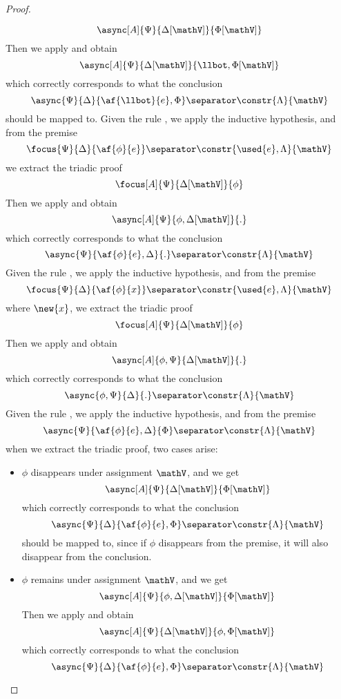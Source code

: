 \begin{proof}
\begin{itemize}
			$$ \async[A]{\Psi}{\Delta[\mathV]}{\Phi[\mathV]} $$
			Then we apply \derRule[A]{\displaybot} and obtain
			$$ \async[A]{\Psi}{\Delta[\mathV]}{\llbot, \Phi[\mathV]} $$
			which correctly corresponds to what the conclusion
			$$ \async{\Psi}{\Delta}{\af{\llbot}{e}, \Phi} \separator \constr{\Lambda}{\mathV} $$
			should be mapped to.
		\indCase{\displaydecide[1]} Given the rule \derRule{\displaydecide[1]}, we apply the inductive hypothesis, and from the premise
			$$ \focus{\Psi}{\Delta}{\af{\phi}{e}} \separator \constr{\used{e}, \Lambda}{\mathV} $$
			we extract the triadic proof
			$$ \focus[A]{\Psi}{\Delta[\mathV]}{\phi} $$
			Then we apply \derRule[A]{\displaydecide[1]} and obtain
			$$ \async[A]{\Psi}{\phi, \Delta[\mathV]}{.} $$
			which correctly corresponds to what the conclusion
			$$ \async{\Psi}{\af{\phi}{e}, \Delta}{.} \separator \constr{\Lambda}{\mathV} $$
		\indCase{\displaydecide[2]} Given the rule \derRule{\displaydecide[2]}, we apply the inductive hypothesis, and from the premise
			$$ \focus{\Psi}{\Delta}{\af{\phi}{x}} \separator \constr{\used{e}, \Lambda}{\mathV} $$
			where $\new{x}$, we extract the triadic proof
			$$ \focus[A]{\Psi}{\Delta[\mathV]}{\phi} $$
			Then we apply \derRule[A]{\displaydecide[2]} and obtain
			$$ \async[A]{\phi, \Psi}{ \Delta[\mathV]}{.} $$
			which correctly corresponds to what the conclusion
			$$ \async{\phi, \Psi}{\Delta}{.} \separator \constr{\Lambda}{\mathV} $$
		\indCase{\displaytodelta} Given the rule \derRule{\displaytodelta}, we apply the inductive hypothesis, and from the premise
			$$ \async{\Psi}{\af{\phi}{e}, \Delta}{\Phi} \separator \constr{\Lambda}{\mathV} $$
			when we extract the triadic proof, two cases arise:
			\begin{itemize}
				\item $\phi$ disappears under assignment $\mathV$, and we get
					$$ \async[A]{\Psi}{\Delta[\mathV]}{\Phi[\mathV]} $$
					which correctly corresponds to what the conclusion
					$$ \async{\Psi}{\Delta}{\af{\phi}{e}, \Phi} \separator \constr{\Lambda}{\mathV} $$
					should be mapped to, since if $\phi$ disappears from the premise, it will also disappear from the conclusion.
				\item $\phi$ remains under assignment $\mathV$, and we get
					$$ \async[A]{\Psi}{\phi, \Delta[\mathV]}{\Phi[\mathV]} $$
					Then we apply \derRule[A]{\displaytodelta} and obtain
					$$ \async[A]{\Psi}{\Delta[\mathV]}{\phi, \Phi[\mathV]} $$
					which correctly corresponds to what the conclusion
					$$ \async{\Psi}{\Delta}{\af{\phi}{e}, \Phi} \separator \constr{\Lambda}{\mathV} $$

\end{itemize}
\end{itemize}
\end{proof}
